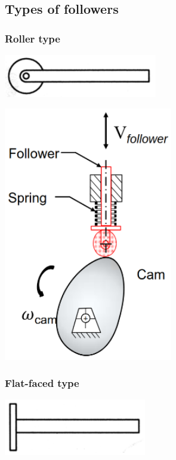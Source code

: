 \documentclass[11pt]{article}
\begin{document}
\subsection{Types of followers}
\label{sec:org15cb91e}

\subsubsection{Roller type}
\label{sec:org447ec14}
\begin{center}
\includegraphics[width=.9\linewidth]{./images/roller-follower.png}
\end{center}

\begin{center}
\includegraphics[height=30em]{./images/roller-follower-and-cam.png}
\end{center}
\subsubsection{Flat-faced type}
\label{sec:org43f8eef}
\begin{center}
\includegraphics[width=.9\linewidth]{./images/flat-faced-follower.png}
\end{center}
\end{document}
